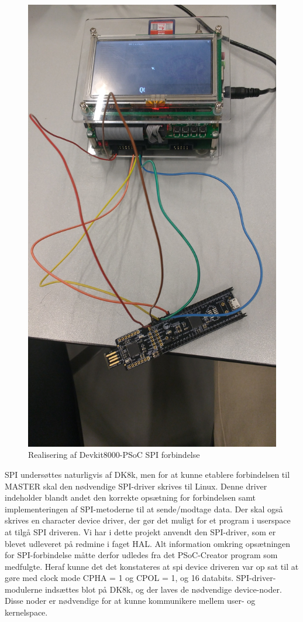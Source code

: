 \begin{figure}[H]
	\centering
\includegraphics[scale=0.1]{Screenshots/Realisering_devkit_psoc}
\caption{Realisering af Devkit8000-PSoC SPI forbindelse}
\end{figure}

SPI undersøttes naturligvis af DK8k, men for at kunne etablere forbindelsen til MASTER skal den nødvendige SPI-driver skrives til Linux. 
Denne driver indeholder blandt andet den korrekte opsætning for forbindelsen samt implementeringen af SPI-metoderne til at sende/modtage data.
Der skal også skrives en character device driver, der gør det muligt for et program i userspace at tilgå SPI driveren. 
Vi har i dette projekt anvendt den SPI-driver, som er blevet udleveret på redmine i faget HAL. Alt information omkring opsætningen for SPI-forbindelse 
måtte derfor udledes fra det PSoC-Creator program som medfulgte. Heraf kunne det det konstateres at spi device driveren var op sat til at gøre med 
clock mode CPHA = 1 og CPOL = 1, og 16 databits. 
SPI-driver-modulerne indsættes blot på DK8k, og der laves de nødvendige device-noder. Disse noder er nødvendige for at kunne kommunikere mellem user- og 
kernelspace. 

